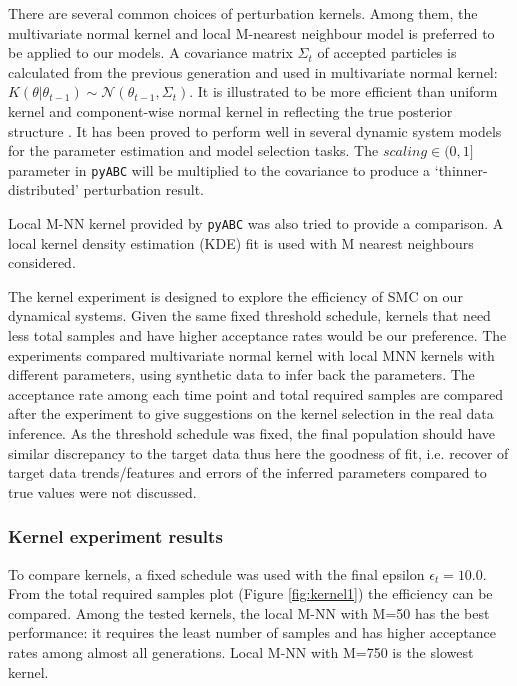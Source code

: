 There are several common choices of perturbation kernels. Among them, the multivariate normal kernel and local M-nearest neighbour model is preferred to be applied to our models. A covariance matrix $\Sigma_t$ of accepted particles is calculated from the previous generation and used in multivariate normal kernel: $K(\theta|\theta_{t-1})\sim\mathcal{N}(\theta_{t-1}, \Sigma_t)$. It is illustrated to be more efficient than uniform kernel and component-wise normal kernel in reflecting the true posterior structure \cite{ref:kernel}. It has been proved to perform well in several dynamic system models \cite{ref:abcsysbio, ref:compare, ref:disease} for the parameter estimation and model selection tasks. The $scaling\in(0,1]$ parameter in \verb|pyABC| will be multiplied to the covariance to produce a `thinner-distributed' perturbation result.

Local M-NN kernel provided by \verb|pyABC| was also tried to provide a comparison. A local kernel density estimation (KDE) fit is used with M nearest neighbours considered.

The kernel experiment is designed to explore the efficiency of SMC on our dynamical systems. Given the same fixed threshold schedule, kernels that need less total samples and have higher acceptance rates would be our preference. The experiments compared multivariate normal kernel with local MNN kernels with different parameters, using synthetic data to infer back the parameters. The acceptance rate among each time point and total required samples are compared after the experiment to give suggestions on the kernel selection in the real data inference. As the threshold schedule was fixed, the final population should have similar discrepancy to the target data thus here the goodness of fit, i.e. recover of target data trends/features and errors of the inferred parameters compared to true values were not discussed.

\subsubsection{Kernel experiment results}

To compare kernels, a fixed schedule was used with the final epsilon $\epsilon_t=10.0$. From the total required samples plot (Figure \ref{fig:kernel1}) the efficiency can be compared. Among the tested kernels, the local M-NN with M=50 has the best performance: it requires the least number of samples and
has higher acceptance rates among almost all generations. Local M-NN with M=750 is the slowest kernel.

